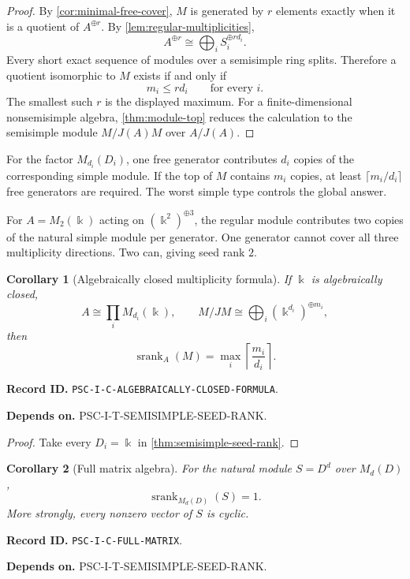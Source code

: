 \documentclass[11pt]{article}
\newtheorem{corollary}[corollary]{Corollary}
\theoremstyle{definition}
\theoremstyle{remark}
\newcommand{\bbk}{\Bbbk}
\newcommand{\srank}{\operatorname{srank}}
\newcommand{\RecordID}[1]{\par\smallskip\noindent\begingroup\footnotesize\color{PSCGray}\raggedright\textbf{Record ID.} \nolinkurl{#1}.\par\endgroup}
\newcommand{\Depends}[1]{\par\noindent\begingroup\footnotesize\color{PSCGray}\raggedright\textbf{Depends on.} #1\par\endgroup}
\begin{document}
\begin{proof}
By \cref{cor:minimal-free-cover}, $M$ is generated by $r$ elements exactly when it is a quotient of $A^{\oplus r}$.  By \cref{lem:regular-multiplicities},
\[
A^{\oplus r}\cong\bigoplus_iS_i^{\oplus rd_i}.
\]
Every short exact sequence of modules over a semisimple ring splits.  Therefore a quotient isomorphic to $M$ exists if and only if
\[
m_i\leq rd_i
\qquad\text{for every }i.
\]
The smallest such $r$ is the displayed maximum.  For a finite-dimensional nonsemisimple algebra, \cref{thm:module-top} reduces the calculation to the semisimple module $M/J(A)M$ over $A/J(A)$.
\end{proof}

\begin{interpretation}
For the factor \(M_{d_i}(D_i)\), one free generator contributes \(d_i\) copies of the corresponding simple module.  If the top of \(M\) contains \(m_i\) copies, at least \(\lceil m_i/d_i\rceil\) free generators are required.  The worst simple type controls the global answer.
\end{interpretation}

\begin{microexample}[title={Multiplicity consumes seed capacity}]
For \(A=M_2(\bbk)\) acting on \((\bbk^2)^{\oplus3}\), the regular module contributes two copies of the natural simple module per generator.  One generator cannot cover all three multiplicity directions.  Two can, giving seed rank \(2\).
\end{microexample}


\begin{corollary}[Algebraically closed multiplicity formula]
\label{cor:algebraically-closed-formula}
If $\bbk$ is algebraically closed,
\[
A\cong\prod_iM_{d_i}(\bbk),
\qquad
M/JM\cong\bigoplus_i(\bbk^{d_i})^{\oplus m_i},
\]
then
\[
\srank_A(M)=\max_i\left\lceil\frac{m_i}{d_i}\right\rceil.
\]
\end{corollary}
\RecordID{PSC-I-C-ALGEBRAICALLY-CLOSED-FORMULA}
\Depends{PSC-I-T-SEMISIMPLE-SEED-RANK.}

\begin{proof}
Take every $D_i=\bbk$ in \cref{thm:semisimple-seed-rank}.
\end{proof}

\begin{corollary}[Full matrix algebra]
\label{cor:full-matrix}
For the natural module $S=D^d$ over $M_d(D)$,
\[
\srank_{M_d(D)}(S)=1.
\]
More strongly, every nonzero vector of $S$ is cyclic.
\end{corollary}
\RecordID{PSC-I-C-FULL-MATRIX}
\Depends{PSC-I-T-SEMISIMPLE-SEED-RANK.}
\end{document}
